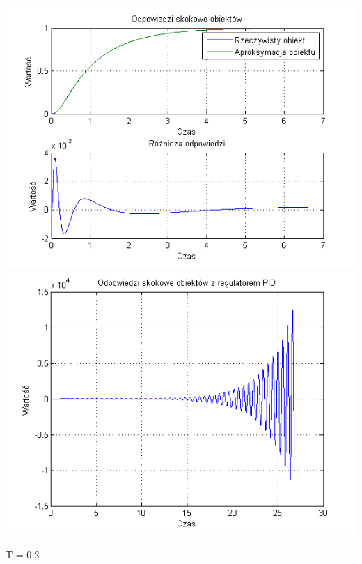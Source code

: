 \documentclass[10pt,a4paper]{article}
\begin{document}
\begin{center}
\includegraphics[scale=1]{images/dwa/skrypt_93.png}\\
\includegraphics[scale=1]{images/dwa/skrypt_94.png}\\
\end{center}
\newpage
T = 0.2
\end{document}
